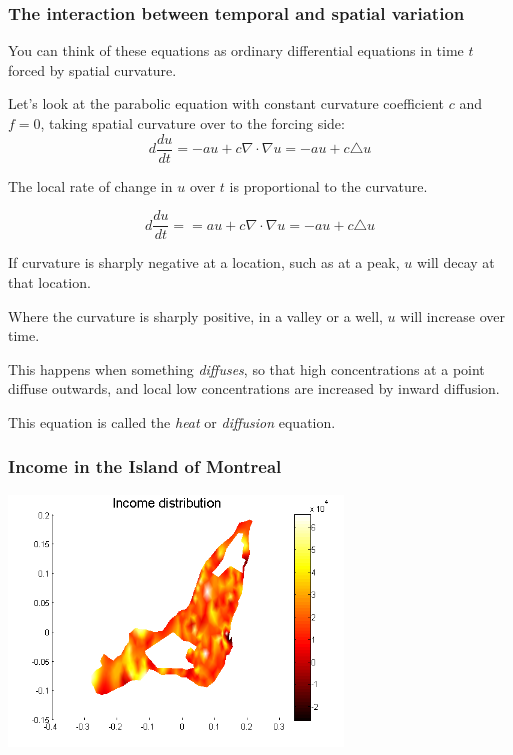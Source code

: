 \documentclass[11pt]{beamer}
\begin{document}

\begin{frame}


\frametitle{The interaction between temporal and spatial variation}

\bi
  \item You can think of these equations as ordinary differential
  equations in time $t$ forced by spatial curvature.
  \item Let's look at the parabolic equation with constant
  curvature coefficient $c$ and $f = 0$, taking spatial curvature over to the
  forcing side:
  \[
    d \frac{du}{dt} = -au
        + c \nabla \cdot \nabla u = -au + c \triangle u
  \]
  \item  The local rate of change in $u$ over $t$ is
  proportional to the curvature.
\ei

\end{frame}


\begin{frame}


  \[
    d \frac{du}{dt} = =au +
        c \nabla \cdot \nabla u = -au + c \triangle u
  \]

\bi
  \item  If curvature is sharply negative at a location,
  such as at a peak, $u$ will decay at that location.
  \item  Where the curvature is sharply positive, in
  a valley or a well, $u$ will increase over time.
  \item  This happens when something \emph{diffuses}, so
  that high concentrations at a point diffuse outwards, and
  local low concentrations are increased by inward diffusion.
  \item This equation is called the \emph{heat} or \emph{diffusion}
  equation.
\ei

\end{frame}


\begin{frame}


\frametitle{Income in the Island of Montreal}

\includegraphics[width=3.5in]{figs/mtlwealth.png}

\end{frame}
\end{document}

